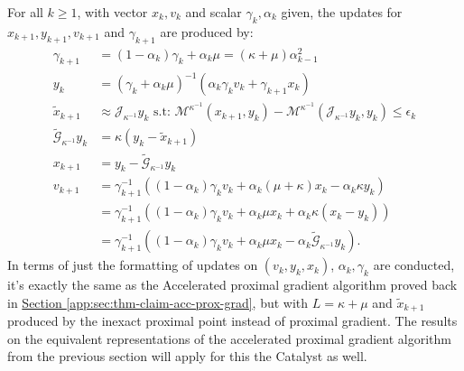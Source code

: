 \documentclass[12pt]{article}
\begin{document}
        \begin{remark}
            For all $k \ge 1$, with vector $x_k, v_k$ and scalar $\gamma_k, \alpha_k$ given, the updates for $x_{k + 1}, y_{k + 1}, v_{k + 1}$ and $\gamma_{k + 1}$ are produced by: 
            \begin{align*}
                \gamma_{k + 1} &= (1 - \alpha_{k})\gamma_k + \alpha_k \mu = (\kappa + \mu)\alpha_{k - 1}^2
                \\
                y_k &= (\gamma_k + \alpha_k \mu)^{-1}
                (\alpha_k \gamma_k v_k + \gamma_{k + 1}x_k)
                \\
                \tilde x_{k + 1} &\approx \mathcal J_{\kappa^{-1}} y_{k} 
                \text{ s.t: } 
                \mathcal M^{\kappa^{-1}}(x_{k + 1}, y_k) - 
                \mathcal M^{\kappa^{-1}}(\mathcal J_{\kappa^{-1}} y_{k} , y_k) \le \epsilon_k
                \\
                \widetilde{\mathcal G}_{\kappa^{-1}} y_k &= \kappa(y_k - \tilde x_{k + 1})
                \\
                x_{k + 1} &= y_k - \widetilde{\mathcal G}_{\kappa^{-1}} y_k
                \\
                v_{k + 1} &= 
                \gamma_{k + 1}^{-1}\left(
                    (1 - \alpha_k)\gamma_k v_k + 
                    \alpha_k(\mu + \kappa)x_k 
                    - \alpha_k \kappa y_k
                \right)
                \\
                &= \gamma_{k + 1}^{-1}(
                    (1 - \alpha_k)\gamma_k v_k + \alpha_k\mu x_k + 
                    \alpha_k\kappa(x_k - y_k)
                )
                \\
                &= 
                \gamma_{k + 1}^{-1}\left(
                    (1 - \alpha_k)\gamma_k v_k + \alpha_k\mu x_k - \alpha_k 
                    \widetilde{\mathcal G}_{\kappa^{-1}}y_k
                \right). 
            \end{align*}
            In terms of just the formatting of updates on $(v_k, y_k, x_k)$, $\alpha_k, \gamma_k$ are conducted, it's exactly the same as the Accelerated proximal gradient algorithm proved back in 
            \hyperref[app:sec:thm-claim-acc-prox-grad]{Section \ref*{app:sec:thm-claim-acc-prox-grad}}, but with $L = \kappa + \mu$ and $\tilde x_{k + 1}$ produced by the inexact proximal point instead of proximal gradient. 
            The results on the equivalent representations of the accelerated proximal gradient algorithm from the previous section will apply for this the Catalyst as well. 

\end{remark}
\end{document}
